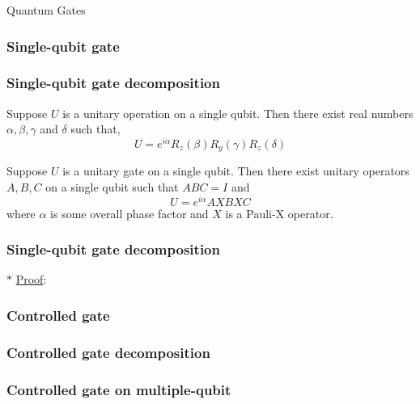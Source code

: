 \documentclass[9pt]{beamer}
\begin{document}
    \begin{section}{Quantum Gates}
        \begin{frame}
            \frametitle{Single-qubit gate}
        
        
        \end{frame}
        \begin{frame}
            \frametitle{Single-qubit gate decomposition}
                \begin{theorem}[ZY decomposition]\label{thr:ZY-de}
                    Suppose $U$ is a unitary operation on a single qubit. Then there exist real numbers $\alpha, \beta, \gamma$ and $\delta$ such that,
                    $$U=e^{i \alpha} R_z(\beta) R_y(\gamma) R_z(\delta)$$
                \end{theorem}
                
                \begin{theorem}\label{thr:Pauli-de}
                    Suppose $U$ is a unitary gate on a single qubit. Then there exist unitary operators $A, B, C$ on a single qubit such that $ABC = I$ and
                    $$ U = e^{i\alpha} AXBXC $$
                    where $\alpha$ is some overall phase factor and $X$ is a Pauli-X operator.
                \end{theorem}

        \end{frame}

        \begin{frame}
            \frametitle{Single-qubit gate decomposition}
                $\ast$ \underline{Proof}:
                
        \end{frame}

        \begin{frame}
            \frametitle{Controlled gate}
        
            
        
        \end{frame}
        \begin{frame}
            \frametitle{Controlled gate decomposition}
        
            
        
        \end{frame}
        \begin{frame}
            \frametitle{Controlled gate on multiple-qubit}
        
            
        

\end{frame}
\end{section}
\end{document}
